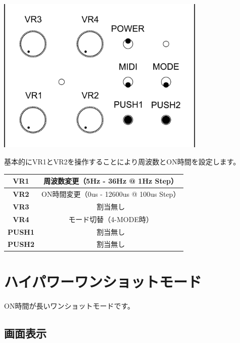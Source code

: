 \documentclass[a4paper,11pt]{jsarticle}
\begin{document}
\vspace*{5mm}
\begin{center}
\includegraphics[width=100mm]{image/Arduino_Interrupter_v1_Design_Interrupter.png}
\end{center}
\vspace*{5mm}

基本的にVR1とVR2を操作することにより周波数とON時間を設定します。

\vspace*{5mm}

\begin{table}[htbp]
\begin{center}
\begin{tabular}{ | c | c | }
\hline
\textbf{VR1} & 周波数変更（5Hz - 36Hz @ 1Hz Step） \\\hline
\textbf{VR2} & ON時間変更（0us - 12600us @ 100us Step） \\\hline
\textbf{VR3} & 割当無し \\\hline
\textbf{VR4} & モード切替（4-MODE時） \\\hline
\textbf{PUSH1} & 割当無し \\\hline
\textbf{PUSH2} & 割当無し \\\hline
\end{tabular}
\end{center}
\end{table}



\clearpage

\section{ハイパワーワンショットモード}

ON時間が長いワンショットモードです。

\subsection{画面表示}
\end{document}
